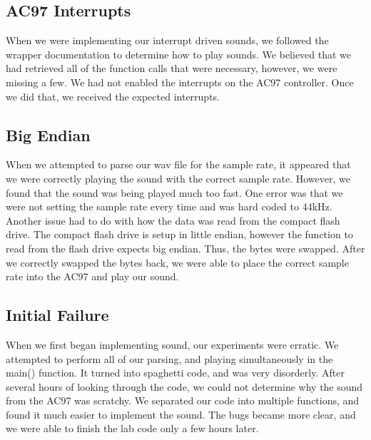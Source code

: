 \documentclass[11pt,letter,oneside]{report}
\begin{document}
\subsection{AC97 Interrupts}
When we were implementing our interrupt driven sounds, we followed the wrapper documentation to determine how to play sounds. We believed that we had retrieved all of the function calls that were necessary, however, we were missing a few. We had not enabled the interrupts on the AC97 controller. Once we did that, we received the expected interrupts.

\subsection{Big Endian}
When we attempted to parse our wav file for the sample rate, it appeared that we were correctly playing the sound with the correct sample rate. However, we found that the sound was being played much too fast. One error was that we were not setting the sample rate every time and was hard coded to 44kHz. Another issue had to do with how the data was read from the compact flash drive. The compact flash drive is setup in little endian, however the function to read from the flash drive expects big endian. Thus, the bytes were swapped. After we correctly swapped the bytes back, we were able to place the correct sample rate into the AC97 and play our sound.

\subsection{Initial Failure}
When we first began implementing sound, our experiments were erratic. We attempted to perform all of our parsing, and playing simultaneously in the main() function. It turned into spaghetti code, and was very disorderly. After several hours of looking through the code, we could not determine why the sound from the AC97 was scratchy. We separated our code into multiple functions, and found it much easier to implement the sound. The bugs became more clear, and we were able to finish the lab code only a few hours later.
\end{document}
